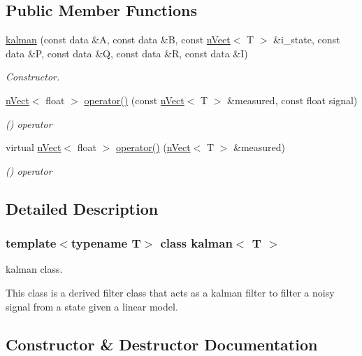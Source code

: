 \subsection*{Public Member Functions}
\begin{DoxyCompactItemize}
\item 
\hyperlink{classkalman_a8181e5861db1cf47644d9b5a02644f8b}{kalman} (const data \&A, const data \&B, const \hyperlink{classnVect}{n\+Vect}$<$ T $>$ \&i\+\_\+state, const data \&P, const data \&Q, const data \&R, const data \&I)
\begin{DoxyCompactList}\small\item\em Constructor. \end{DoxyCompactList}\item 
\hyperlink{classnVect}{n\+Vect}$<$ float $>$ \hyperlink{classkalman_ad3ce18dcca9e21b8b2cbcf25915327ac}{operator()} (const \hyperlink{classnVect}{n\+Vect}$<$ T $>$ \&measured, const float signal)
\begin{DoxyCompactList}\small\item\em () operator \end{DoxyCompactList}\item 
virtual \hyperlink{classnVect}{n\+Vect}$<$ float $>$ \hyperlink{classkalman_ae3c0c97ba8c3eb2eba0134a3adf701ed}{operator()} (\hyperlink{classnVect}{n\+Vect}$<$ T $>$ \&measured)
\begin{DoxyCompactList}\small\item\em () operator \end{DoxyCompactList}\end{DoxyCompactItemize}


\subsection{Detailed Description}
\subsubsection*{template$<$typename T$>$\newline
class kalman$<$ T $>$}

kalman class. 

This class is a derived filter class that acts as a kalman filter to filter a noisy signal from a state given a linear model. 

\subsection{Constructor \& Destructor Documentation}
\mbox{\label{classkalman_a8181e5861db1cf47644d9b5a02644f8b}} 
